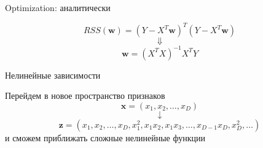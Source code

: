 \documentclass[aspectratio=169]{beamer}
\begin{document}
\begin{frame}{Optimization: аналитически}

\[
RSS(\mathbf{w}) = (Y - X^T \mathbf{w})^T (Y - X^T \mathbf{w})
\]
\[
\Downarrow
\]
\[
\mathbf{w} = (X^T X)^{-1} X^T Y
\]

\end{frame}

\begin{frame}{Нелинейные зависимости}

Перейдем в новое пространство признаков
\[
\mathbf{x} = (x_1, x_2, \ldots, x_{D})
\]
\[
\downarrow
\]
\[
\mathbf{z} = (x_1, x_2, \ldots, x_D, x_1^2, x_1 x_2, x_1 x_3, \ldots,  x_{D-1} x_D, x_D^2, \ldots)
\]
и сможем приближать сложные нелинейные функции

\end{frame}
\end{document}

